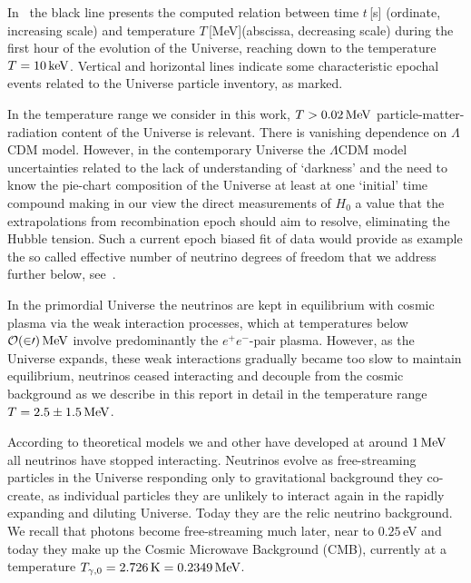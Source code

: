In~ the black line presents the computed relation between time $t$\,[s] (ordinate, increasing scale) and temperature $T$\,[MeV](abscissa, decreasing scale) during the first hour of the evolution of the Universe, reaching down to the temperature $T=10\text{\,keV}$. Vertical and horizontal lines indicate some characteristic epochal events related to the Universe particle inventory, as marked. 

In the temperature range we consider in this work, $T>0.02\text{\,MeV}$ particle-matter-radiation content of the Universe is relevant. There is vanishing dependence on $\Lambda$CDM model. However, in the contemporary Universe the $\Lambda$CDM model uncertainties related to the lack of understanding of `darkness' and the need to know the pie-chart composition of the Universe at least at one `initial' time compound making in our view the direct measurements of $H_0$ a value that the extrapolations from recombination epoch should aim to resolve, eliminating the Hubble tension. Such a current epoch biased fit of data would provide as example the so called effective number of neutrino degrees of freedom that we address further below, see~.


In the primordial Universe the neutrinos are kept in equilibrium with cosmic plasma via the weak interaction processes, which at temperatures below $\cal{O}(20)\MeV$ involve predominantly the $e^+e^-$-pair plasma. However, as the Universe expands, these weak interactions gradually became too slow to maintain equilibrium, neutrinos ceased interacting and decouple from the cosmic background as we describe in this report in detail in the temperature range $T=2.5\pm1.5\text{\,MeV}$.

According to theoretical models we and other have developed at around $1\text{\,MeV}$ all neutrinos have stopped interacting. Neutrinos evolve as free-streaming particles in the Universe responding only to gravitational background they co-create, as individual particles they are unlikely to interact again in the rapidly expanding and diluting Universe. Today they are the relic neutrino background. We recall that photons become free-streaming much later, near to $0.25$\,eV and today they make up the Cosmic Microwave Background (CMB), currently at a temperature $T_{\gamma,0} =2.726\,\mathrm{K}=0.2349\text{\,MeV}$.

